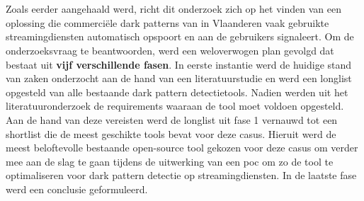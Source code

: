 
\chapter{}%
\label{ch:methodologie}


Zoals eerder aangehaald werd, richt dit onderzoek zich op het vinden van een oplossing die commerciële dark patterns van in Vlaanderen vaak gebruikte streamingdiensten automatisch opspoort en aan de gebruikers signaleert. Om de onderzoeksvraag te beantwoorden, werd een weloverwogen plan gevolgd dat bestaat uit \textbf{vijf verschillende fasen}. In eerste instantie werd de huidige stand van zaken onderzocht aan de hand van een literatuurstudie en werd een longlist opgesteld van alle bestaande dark pattern detectietools. Nadien werden uit het literatuuronderzoek de requirements waaraan de tool moet voldoen opgesteld. Aan de hand van deze vereisten werd de longlist uit fase 1 vernauwd tot een shortlist die de meest geschikte tools bevat voor deze casus. Hieruit werd de meest beloftevolle bestaande open-source tool gekozen voor deze casus om verder mee aan de slag te gaan tijdens de uitwerking van een \acrlong{poc} om zo de tool te optimaliseren voor dark pattern detectie op streamingdiensten. In de laatste fase werd een conclusie geformuleerd. 

